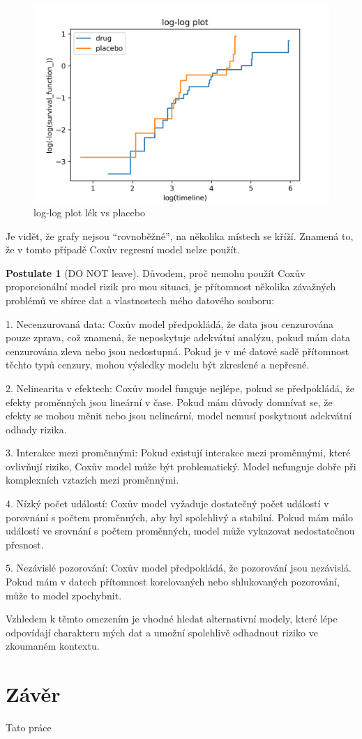 \documentclass[a4, 11pt]{article}
\newcommand{\uvoz}[1]{``{#1}''}                        %
\theoremstyle{definition}
\newtheorem{temppostulateforbackground}{Postulate}
\newenvironment{postulate}
{
	\colorlet{shadecolor}{orange!15}
	\begin{shaded} \vspace{-10pt}
		\begin{temppostulateforbackground}
		}
		{
		\end{temppostulateforbackground} \vspace{-10pt}
	\end{shaded}
}
\theoremstyle{remark}
\begin{document}
	\begin{figure}[H]
		\centering
		\includegraphics[width=0.6\linewidth]{img/loglogplot_KM.png}
	 	\caption{log-log plot lék vs placebo}
	 	\label{fig:loglogplot_drug_vs_placebo}
	\end{figure}
	
	Je vidět, že grafy nejsou \uvoz{rovnoběžné}, na několika místech se kříží. 
    Znamená to, že v tomto případě Coxův regresní model nelze použít. 

    
    \begin{postulate}[DO NOT leave]
        Důvodem, proč nemohu použít Coxův proporcionální model rizik pro mou situaci, je přítomnost několika závažných problémů ve sbírce dat a vlastnostech mého datového souboru:
        
        1. Necenzurovaná data: Coxův model předpokládá, že data jsou cenzurována pouze zprava, což znamená, že neposkytuje adekvátní analýzu, pokud mám data cenzurována zleva nebo jsou nedostupná. Pokud je v mé datové sadě přítomnost těchto typů cenzury, mohou výsledky modelu být zkreslené a nepřesné.
        
        2. Nelinearita v efektech: Coxův model funguje nejlépe, pokud se předpokládá, že efekty proměnných jsou lineární v čase. Pokud mám důvody domnívat se, že efekty se mohou měnit nebo jsou nelineární, model nemusí poskytnout adekvátní odhady rizika.
        
        3. Interakce mezi proměnnými: Pokud existují interakce mezi proměnnými, které ovlivňují riziko, Coxův model může být problematický. Model nefunguje dobře při komplexních vztazích mezi proměnnými.
        
        4. Nízký počet událostí: Coxův model vyžaduje dostatečný počet událostí v porovnání s počtem proměnných, aby byl spolehlivý a stabilní. Pokud mám málo událostí ve srovnání s počtem proměnných, model může vykazovat nedostatečnou přesnost.
        
        5. Nezávislé pozorování: Coxův model předpokládá, že pozorování jsou nezávislá. Pokud mám v datech přítomnost korelovaných nebo shlukovaných pozorování, může to model zpochybnit.
        
        Vzhledem k těmto omezením je vhodné hledat alternativní modely, které lépe odpovídají charakteru mých dat a umožní spolehlivě odhadnout riziko ve zkoumaném kontextu.
    \end{postulate}
    
	
	\newpage
	\section{Závěr}\label{sec:zaver}
	Tato práce 
\end{document}
